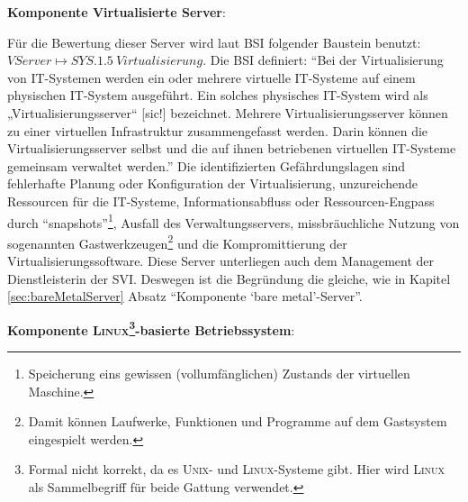 \par
\textbf{Komponente Virtualisierte Server}:
\par
Für die Bewertung dieser Server wird laut \ac{BSI} folgender Baustein benutzt: $VServer \mapsto SYS.1.5\ Virtualisierung$. Die \ac{BSI} definiert: \enquote{Bei der Virtualisierung von IT-Systemen werden ein oder mehrere virtuelle IT-Systeme auf einem physischen IT-System ausgeführt. Ein solches physisches IT-System wird als „Virtualisierungsserver“ [sic!] bezeichnet. Mehrere Virtualisierungsserver können zu einer virtuellen Infrastruktur zusammengefasst werden. Darin können die Virtualisierungsserver selbst und die auf ihnen betriebenen virtuellen IT-Systeme gemeinsam verwaltet werden.}\autocite[][S.\,485]{bundesamt_fur_sicherheit_in_der_informationstechnik_bsi_it-grundschutz-kompendium_2020} Die identifizierten Gefährdungslagen sind fehlerhafte Planung oder Konfiguration der Virtualisierung, unzureichende Ressourcen für die IT-Systeme, Informationsabfluss oder Ressourcen-Engpass durch \enquote{snapshots}\footnote{Speicherung eins gewissen (vollumfänglichen) Zustands der virtuellen Maschine.}, Ausfall des Verwaltungsservers, missbräuchliche Nutzung von sogenannten Gastwerkzeugen\footnote{Damit können Laufwerke, Funktionen und Programme auf dem Gastsystem eingespielt werden.} und die Kompromittierung der Virtualisierungssoftware.\autocite[vgl.][S.\,486-487]{bundesamt_fur_sicherheit_in_der_informationstechnik_bsi_it-grundschutz-kompendium_2020} Diese Server unterliegen auch dem Management der Dienstleisterin der \ac{SVI}. Deswegen ist die Begründung die gleiche, wie in Kapitel \vref{sec:bareMetalServer} Absatz \enquote{Komponente \enquote{bare metal}-Server}. 
\par
\textbf{Komponente \textsc{Linux}\footnote{Formal nicht korrekt, da es \textsc{Unix}- und \textsc{Linux}-Systeme gibt. Hier wird \textsc{Linux} als Sammelbegriff für beide Gattung verwendet.}-basierte Betriebssystem}:
\par
